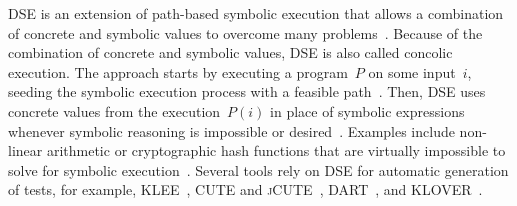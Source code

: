 \documentclass[paper=a4,%
  twoside,%
  BCOR4mm,%
  abstract=true,%
  toc=bibliography,%
  chapterprefix=true,%
  toc=bibliographynumbered,%
  open=right,%
  english,%
  pagesize=pdftex]{scrreprt}
\begin{document}

\ac{DSE} is an extension of path-based symbolic execution that allows a combination of concrete and symbolic values to overcome many problems~\cite{Fraser_2013}. Because of the combination of concrete and symbolic values, \ac{DSE} is also called concolic execution. The approach starts by executing a program~$P$ on some input~$i$, seeding the symbolic execution process with a feasible path~\cite{Gupta2000,Korel1992}. Then, \ac{DSE} uses concrete values from the execution~$P(i)$ in place of symbolic expressions whenever symbolic reasoning is impossible or desired~\cite{Cadar2005}. Examples include non-linear arithmetic or cryptographic hash functions that are virtually impossible to solve for symbolic execution~\cite{Ball2015}. Several tools rely on \ac{DSE} for automatic generation of tests, for example, \textsc{KLEE}~\cite{cadar2008klee}, \textsc{CUTE} and \textsc{jCUTE}~\cite{Sen2006}, \textsc{DART}~\cite{Godefroid_2005}, and \textsc{KLOVER}~\cite{Li2011}. 
\end{document}
